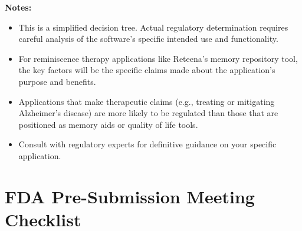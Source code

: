 \begin{tcolorbox}[title=Software as a Medical Device (SaMD) Determination]
\begin{center}
\begin{tikzpicture}
\end{tikzpicture}
\end{center}

\textbf{Notes:}
\begin{itemize}
    \item This is a simplified decision tree. Actual regulatory determination requires careful analysis of the software's specific intended use and functionality.
    
    \item For reminiscence therapy applications like Reteena's memory repository tool, the key factors will be the specific claims made about the application's purpose and benefits.
    
    \item Applications that make therapeutic claims (e.g., treating or mitigating Alzheimer's disease) are more likely to be regulated than those that are positioned as memory aids or quality of life tools.
    
    \item Consult with regulatory experts for definitive guidance on your specific application.
\end{itemize}
\end{tcolorbox}

\section{FDA Pre-Submission Meeting Checklist}

